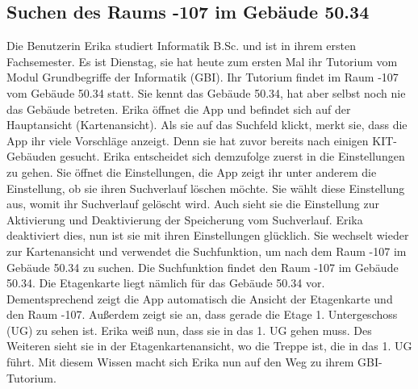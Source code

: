 \subsection{Suchen des Raums -107 im Gebäude 50.34}

Die \Gls{Benutzer}in Erika studiert Informatik B.Sc. und ist in ihrem ersten Fachsemester.
Es ist Dienstag, sie hat heute zum ersten Mal ihr Tutorium vom Modul Grundbegriffe der Informatik (GBI).
Ihr Tutorium findet im Raum -107 vom Gebäude 50.34 statt.
Sie kennt das Gebäude 50.34, hat aber selbst noch nie das Gebäude betreten.
Erika öffnet die App und befindet sich auf der Hauptansicht (\Gls{Kartenansicht}).
Als sie auf das \Gls{Suchfeld} klickt, merkt sie, dass die App ihr viele Vorschläge anzeigt.
Denn sie hat zuvor bereits nach einigen \Gls{KIT}-Gebäuden gesucht.
Erika entscheidet sich demzufolge zuerst in die Einstellungen zu gehen.
Sie öffnet die Einstellungen, die App zeigt ihr unter anderem die Einstellung, ob sie ihren \Gls{Suchverlauf} löschen möchte.
Sie wählt diese Einstellung aus, womit ihr \Gls{Suchverlauf} gelöscht wird.
Auch sieht sie die Einstellung zur Aktivierung und Deaktivierung der Speicherung vom \Gls{Suchverlauf}.
Erika deaktiviert dies, nun ist sie mit ihren Einstellungen glücklich.
Sie wechselt wieder zur \Gls{Kartenansicht} und verwendet die Suchfunktion, um nach dem Raum -107 im Gebäude 50.34 zu suchen.
Die Suchfunktion findet den Raum -107 im Gebäude 50.34.
Die \Gls{Etagenkarte} liegt nämlich für das Gebäude 50.34 vor.
Dementsprechend zeigt die App automatisch die Ansicht der \Gls{Etagenkarte} und den Raum -107.
Außerdem zeigt sie an, dass gerade die Etage 1. Untergeschoss (UG) zu sehen ist.
Erika weiß nun, dass sie in das 1. UG gehen muss.
Des Weiteren sieht sie in der \Gls{Etagenkartenansicht}, wo die Treppe ist, die in das 1. UG führt.
Mit diesem Wissen macht sich Erika nun auf den Weg zu ihrem GBI-Tutorium.